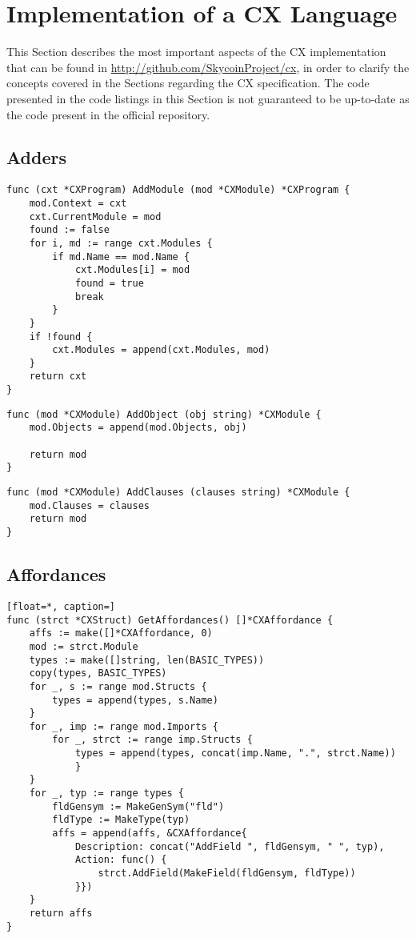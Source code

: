 \chapter{Implementation of a CX Language}
\label{implementation-of-a-cx-language}

This Section describes the most important aspects of the CX
implementation that can be found in
\url{http://github.com/SkycoinProject/cx}, in order to clarify the concepts
covered in the Sections regarding the CX specification. The code
presented in the code listings in this Section is not guaranteed to be
up-to-date as the code present in the official repository.

\section{Adders}
\label{implementation-adders}



\begin{lstlisting}[float=*, caption=Example of an AddModule adder, label=implementation-addmodule]
func (cxt *CXProgram) AddModule (mod *CXModule) *CXProgram {
	mod.Context = cxt
	cxt.CurrentModule = mod
	found := false
	for i, md := range cxt.Modules {
		if md.Name == mod.Name {
			cxt.Modules[i] = mod
			found = true
			break
		}
	}
	if !found {
		cxt.Modules = append(cxt.Modules, mod)
	}
	return cxt
}
\end{lstlisting}

\begin{lstlisting}[float=*, caption=Example of an AddObject adder, label=implementation-addobject]
func (mod *CXModule) AddObject (obj string) *CXModule {
	mod.Objects = append(mod.Objects, obj)

	return mod
}
\end{lstlisting}

\begin{lstlisting}[float=*, caption=Example of an AddClauses adder, label=implementation-addclauses]
func (mod *CXModule) AddClauses (clauses string) *CXModule {
	mod.Clauses = clauses
	return mod
}
\end{lstlisting}

\section{Affordances}
\label{implementation-affordances}

\begin{lstlisting}[float=*, caption=]
func (strct *CXStruct) GetAffordances() []*CXAffordance {
	affs := make([]*CXAffordance, 0)
	mod := strct.Module
	types := make([]string, len(BASIC_TYPES))
	copy(types, BASIC_TYPES)
	for _, s := range mod.Structs {
		types = append(types, s.Name)
	}
	for _, imp := range mod.Imports {
		for _, strct := range imp.Structs {
			types = append(types, concat(imp.Name, ".", strct.Name))
	       	}
	}
	for _, typ := range types {
		fldGensym := MakeGenSym("fld")
		fldType := MakeType(typ)
		affs = append(affs, &CXAffordance{
			Description: concat("AddField ", fldGensym, " ", typ),
			Action: func() {
				strct.AddField(MakeField(fldGensym, fldType))
			}})
	}
	return affs
}
\end{lstlisting}

